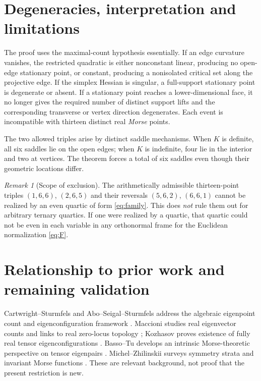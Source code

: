 \documentclass[10pt,a4paper]{article}
\theoremstyle{plain}
\theoremstyle{remark}
\newtheorem{remark}[theorem]{Remark}
\begin{document}
\section{Degeneracies, interpretation and limitations}
The proof uses the maximal-count hypothesis essentially. If an edge curvature vanishes, the restricted quadratic is either nonconstant linear, producing no open-edge stationary point, or constant, producing a nonisolated critical set along the projective edge. If the simplex Hessian is singular, a full-support stationary point is degenerate or absent. If a stationary point reaches a lower-dimensional face, it no longer gives the required number of distinct support lifts and the corresponding transverse or vertex direction degenerates. Each event is incompatible with thirteen distinct real \emph{Morse} points.

The two allowed triples arise by distinct saddle mechanisms. When $K$ is definite, all six saddles lie on the open edges; when $K$ is indefinite, four lie in the interior and two at vertices. The theorem forces a total of six saddles even though their geometric locations differ.

\begin{remark}[Scope of exclusion]
The arithmetically admissible thirteen-point triples $(1,6,6)$, $(2,6,5)$ and their reversals $(5,6,2)$, $(6,6,1)$ cannot be realized by an even quartic of form \eqref{eq:family}. This does \emph{not} rule them out for arbitrary ternary quartics. If one were realized by a quartic, that quartic could not be even in each variable in any orthonormal frame for the Euclidean normalization \eqref{eq:F}.
\end{remark}

\newpage
\section{Relationship to prior work and remaining validation}
Cartwright--Sturmfels and Abo--Seigal--Sturmfels address the algebraic eigenpoint count and eigenconfiguration framework \cite{cartwright2013,abo2017}. Maccioni studies real eigenvector counts and links to real zero-locus topology \cite{maccioni2018}; Kozhasov proves existence of fully real tensor eigenconfigurations \cite{kozhasov2018}. Basso--Tu develops an intrinsic Morse-theoretic perspective on tensor eigenpairs \cite{bassotu2020}. Michel--Zhilinskii surveys symmetry strata and invariant Morse functions \cite{michel2001}. These are relevant background, not proof that the present restriction is new.
\end{document}
